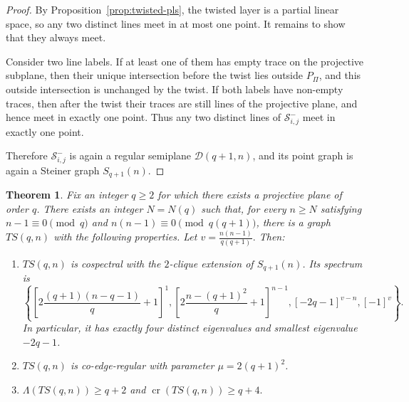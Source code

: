 \documentclass[reqno,a4paper,11pt]{article}
\newtheorem{thm}{Theorem}[section]
\theoremstyle{definition}
\theoremstyle{remark}
\begin{document}
\begin{proof}
	By Proposition~\ref{prop:twisted-pls}, the twisted layer is a partial
	linear space, so any two distinct lines meet in at most one point.  It
	remains to show that they always meet.
	
	Consider two line labels.  If at least one of them has empty trace on the
	projective subplane, then their unique intersection before the twist lies
	outside \(P_\Pi\), and this outside intersection is unchanged by the twist.
	If both labels have non-empty traces, then after the twist their traces are
	still lines of the projective plane, and hence meet in exactly one point.
	Thus any two distinct lines of \(\mathcal S^-_{i,j}\) meet in exactly one
	point.
	
	Therefore \(\mathcal S^-_{i,j}\) is again a regular semiplane
	\(\mathcal D(q+1,n)\), and its point graph is again a Steiner graph
	\(S_{q+1}(n)\).
\end{proof}

\begin{thm}\label{thm:steiner-application}
Fix an integer \(q\ge2\) for which there exists a projective plane of order \(q\). There exists an integer $N=N(q)$ such that, for every $n\ge N$ satisfying $n-1\equiv0\pmod q$ and $n(n-1)\equiv0\pmod{q(q+1)}$, there is a graph $TS(q,n)$ with the following properties.
Let
$v=\frac{n(n-1)}{q(q+1)}.$
Then:
\begin{enumerate}[label=\textup{(\roman*)}]
\item $TS(q,n)$ is cospectral with the $2$-clique extension of $S_{q+1}(n)$.
Its spectrum is
\[
\left\{
\left[2\frac{(q+1)(n-q-1)}{q}+1\right]^1,
\left[2\frac{n-(q+1)^2}{q}+1\right]^{n-1},
[-2q-1]^{v-n},
[-1]^v
\right\}.
\]
In particular, it has exactly four distinct eigenvalues and smallest eigenvalue $-2q-1$.
\item $TS(q,n)$ is co-edge-regular with parameter $\mu=2(q+1)^2$.
\item
$
\Lambda(TS(q,n))\ge q+2$ and $
\operatorname{cr}(TS(q,n))\ge q+4.$
\end{enumerate}
\end{thm}
\end{document}
